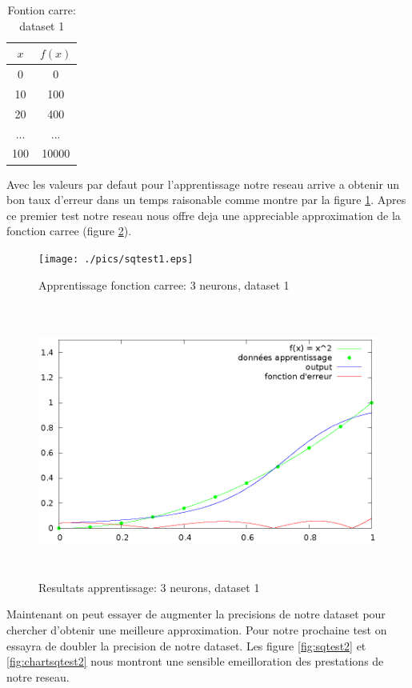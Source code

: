 \documentclass[twoside,openright,a4paper,11pt,french]{article}
\begin{document}
\begin{table}[h]
  \centering
  \begin{tabular}{| c | c |}
    \hline
    \textbf{$x$} & \textbf{$f(x)$}\\
    \hline
    0 & 0 \\
    \hline
    10 & 100 \\
    \hline
    20 & 400 \\
    \hline
    ... & ... \\
    \hline
    100 & 10000 \\
    \hline
  \end{tabular}
  \caption{Fontion carre: dataset 1}
  \label{tab:fqt1}
\end{table}

Avec les valeurs par defaut pour l'apprentissage notre reseau arrive a obtenir
un bon taux d'erreur dans un temps raisonable comme montre par la figure
\ref{fig:sqtest1}. Apres ce premier test notre reseau nous offre deja une
appreciable approximation de la fonction carree (figure \ref{fig:chartsqtest1}).

\begin{figure}[h]
\centering
\texttt{[image: ./pics/sqtest1.eps]}
\caption{Apprentissage fonction carree: 3 neurons, dataset 1}
\label{fig:sqtest1}
\end{figure}

\begin{figure}[h]
\centering
\includegraphics[width=12cm,height=9cm]{./pics/chartsqtest1.eps}
\caption{Resultats apprentissage: 3 neurons, dataset 1}
\label{fig:chartsqtest1}
\end{figure}

Maintenant on peut essayer de augmenter la precisions de notre dataset
pour chercher d'obtenir une meilleure approximation. Pour notre 
prochaine test on essayra de doubler la precision de notre dataset.
Les figure \ref{fig:sqtest2} et \ref{fig:chartsqtest2} nous montront une sensible 
emeilloration des prestations de notre reseau. 
\end{document}
